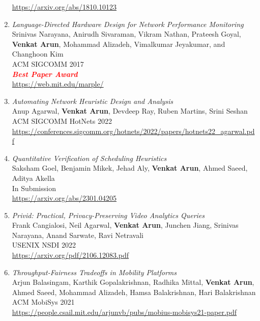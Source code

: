 \documentclass[notitlepage]{article}
\newcommand{\highlight}[1]{\textcolor{red}{\textit{\textbf{#1}}}}
\begin{document}
\begin{enumerate}
  \url{https://arxiv.org/abs/1810.10123}\\
\item {\it Language-Directed Hardware Design for Network Performance Monitoring}\\
  Srinivas Narayana,  Anirudh Sivaraman,  Vikram Nathan,  Prateesh Goyal, {\bf Venkat Arun}, Mohammad Alizadeh, Vimalkumar Jeyakumar, and Changhoon Kim\\
  ACM SIGCOMM 2017\\
  \highlight{Best Paper Award}\\
  \url{https://web.mit.edu/marple/}\\
\item {\it Automating Network Heuristic Design and Analysis}\label{paper:ccmatic}\\
  Anup Agarwal, {\bf Venkat Arun}, Devdeep Ray, Ruben Martins, Srini Seshan\\
  ACM SIGCOMM HotNets 2022\\
  \url{https://conferences.sigcomm.org/hotnets/2022/papers/hotnets22_agarwal.pdf}\\
\item {\it Quantitative Verification of Scheduling Heuristics}\label{paper:sched-verify}\\
  Saksham Goel, Benjamin Mikek, Jehad Aly, {\bf Venkat Arun}, Ahmed Saeed, Aditya Akella\\
  In Submission\\
  \url{https://arxiv.org/abs/2301.04205}\\
\item {\it Privid: Practical, Privacy-Preserving Video Analytics Queries}\label{paper:privid}\\
  Frank Cangialosi, Neil Agarwal, {\bf Venkat Arun}, Junchen Jiang, Srinivas Narayana, Anand Sarwate, Ravi Netravali\\
  USENIX NSDI 2022\\
  \url{https://arxiv.org/pdf/2106.12083.pdf}\\
\item {\it Throughput-Fairness Tradeoffs in Mobility Platforms}\\
  Arjun Balasingam, Karthik Gopalakrishnan, Radhika Mittal, {\bf Venkat Arun}, Ahmed Saeed, Mohammad Alizadeh, Hamsa Balakrishnan, Hari Balakrishnan\\
  ACM MobiSys 2021\\
  \url{https://people.csail.mit.edu/arjunvb/pubs/mobius-mobisys21-paper.pdf}\\

\end{enumerate}
\end{document}
